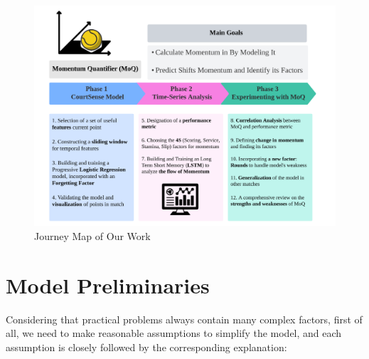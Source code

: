 \documentclass[12pt]{article}  %
\begin{document}
\begin{figure}[htbp]  %
	\centering  %
	\includegraphics[width=.8\textwidth]{work.png} %
	\caption{Journey Map of Our Work} %
\end{figure}
\vspace{-0.8cm}



\section{Model Preliminaries}
Considering that practical problems always contain many complex factors, first of all, we need to make reasonable assumptions to simplify the model, and each assumption is closely followed by the corresponding explanation:
\end{document}

